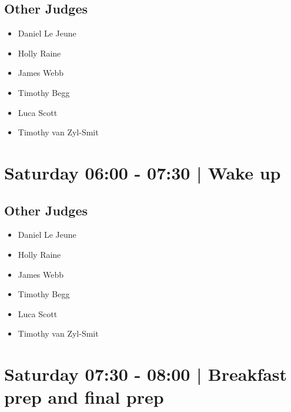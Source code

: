 \documentclass[10pt]{article}
\begin{document}
                
        \subsection*{Other Judges}
        
            \begin{itemize}
                            \item Daniel Le Jeune
                            \item Holly Raine
                            \item James Webb
                            \item Timothy Begg
                            \item Luca Scott
                            \item Timothy van Zyl-Smit
                        \end{itemize}
        

            \section*{Saturday 06:00
        -
        07:30
        |
         Wake up}
        
                
        \subsection*{Other Judges}
        
            \begin{itemize}
                            \item Daniel Le Jeune
                            \item Holly Raine
                            \item James Webb
                            \item Timothy Begg
                            \item Luca Scott
                            \item Timothy van Zyl-Smit
                        \end{itemize}
        

            \section*{Saturday 07:30
        -
        08:00
        |
         Breakfast prep and final prep}
        
                
\end{document}

